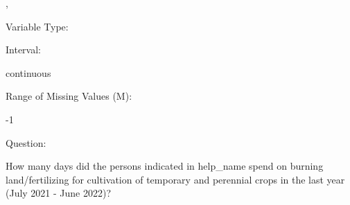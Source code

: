 \documentclass[
]{article}
\begin{document}
,

\begin{minipage}[t]{0.3\linewidth}

\colorbox{mypink1}{}

\end{minipage}%
\begin{minipage}[t]{0.7\linewidth}

\colorbox{mypink1}{\makebox[\textwidth]{\strut\bfseries\color{black}  
 }}

\end{minipage}

\begin{minipage}[t]{0.3\linewidth}

Variable Type:

\end{minipage}%
\begin{minipage}[t]{0.7\linewidth}

\end{minipage}

\begin{minipage}[t]{0.3\linewidth}

Interval:

\end{minipage}%
\begin{minipage}[t]{0.7\linewidth}

continuous

\end{minipage}

\begin{minipage}[t]{0.3\linewidth}

Range of Missing Values (M):

\end{minipage}%
\begin{minipage}[t]{0.7\linewidth}

-1

\end{minipage}

\begin{minipage}[t]{0.3\linewidth}

Question:

\end{minipage}%
\begin{minipage}[t]{0.7\linewidth}

How many days did the persons indicated in help\_name spend on burning
land/fertilizing for cultivation of temporary and perennial crops in the
last year (July 2021 - June 2022)?

\end{minipage}
\end{document}
